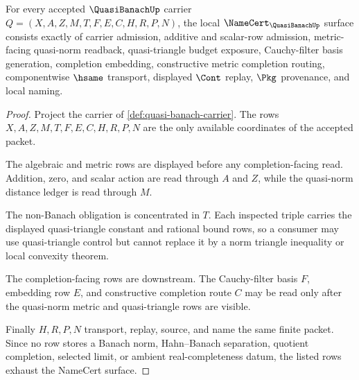 \begin{theorem}
\label{thm:quasi-banach-namecert-obligations}
For every accepted $\QuasiBanachUp$ carrier $Q=(X,A,Z,M,T,F,E,C,H,R,P,N)$, the local $\NameCert_{\QuasiBanachUp}$ surface consists exactly of carrier admission, additive and scalar-row admission, metric-facing quasi-norm readback, quasi-triangle budget exposure, Cauchy-filter basis generation, completion embedding, constructive metric completion routing, componentwise $\hsame$ transport, displayed $\Cont$ replay, $\Pkg$ provenance, and local naming.
\end{theorem}
\begin{proof}
Project the carrier of \autoref{def:quasi-banach-carrier}. The rows $X,A,Z,M,T,F,E,C,H,R,P,N$ are the only available coordinates of the accepted packet.

The algebraic and metric rows are displayed before any completion-facing read. Addition, zero, and scalar action are read through $A$ and $Z$, while the quasi-norm distance ledger is read through $M$.

The non-Banach obligation is concentrated in $T$. Each inspected triple carries the displayed quasi-triangle constant and rational bound rows, so a consumer may use quasi-triangle control but cannot replace it by a norm triangle inequality or local convexity theorem.

The completion-facing rows are downstream. The Cauchy-filter basis $F$, embedding row $E$, and constructive completion route $C$ may be read only after the quasi-norm metric and quasi-triangle rows are visible.

Finally $H,R,P,N$ transport, replay, source, and name the same finite packet. Since no row stores a Banach norm, Hahn--Banach separation, quotient completion, selected limit, or ambient real-completeness datum, the listed rows exhaust the NameCert surface.
\end{proof}

